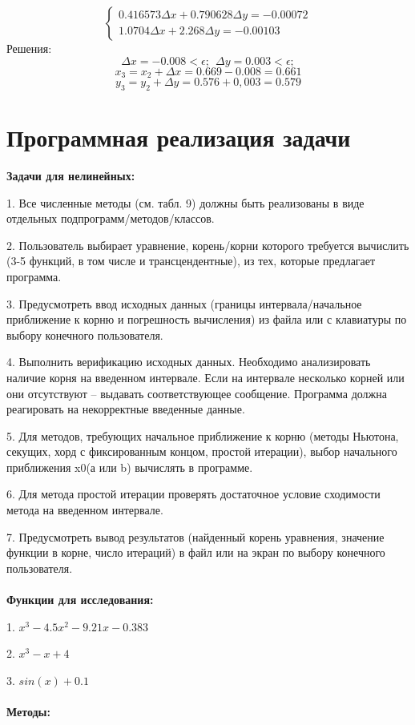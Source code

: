 \documentclass{article}
\begin{document}
\[\begin{cases}
    0.416573\Delta x +0.790628\Delta y = -0.00072\\
    1.0704\Delta x + 2.268\Delta y = -0.00103
\end{cases} 
\]
Решения:
\[\Delta x = -0.008 < \epsilon; \ \ 
\Delta y = 0.003 < \epsilon;
\]
\[x_3 = x_2 + \Delta x = 0.669 - 0.008 = 0.661\]
\[y_3 = y_2 + \Delta y = 0.576 + 0,003 = 0.579\]

\section{Программная реализация задачи}
\textbf{Задачи для нелинейных:}

1. Все численные методы (см. табл. 9) должны быть реализованы в виде отдельных подпрограмм/методов/классов.

2. Пользователь выбирает уравнение, корень/корни которого требуется вычислить (3-5 функций, в том числе и трансцендентные), из тех, которые предлагает программа.

3. Предусмотреть ввод исходных данных (границы интервала/начальное приближение к корню и погрешность вычисления) из файла или с клавиатуры по
выбору конечного пользователя.

4. Выполнить верификацию исходных данных. Необходимо анализировать наличие корня на введенном интервале. Если на интервале несколько корней или
они отсутствуют – выдавать соответствующее сообщение. Программа должна
реагировать на некорректные введенные данные.

5. Для методов, требующих начальное приближение к корню (методы Ньютона,
секущих, хорд с фиксированным концом, простой итерации), выбор начального приближения x0(а или b) вычислять в программе.

6. Для метода простой итерации проверять достаточное условие сходимости метода на введенном интервале.

7. Предусмотреть вывод результатов (найденный корень уравнения, значение
функции в корне, число итераций) в файл или на экран по выбору конечного
пользователя.
\\ \\
\textbf{Функции для исследования: }

1. $x^3 - 4.5x^2 - 9.21x - 0.383$

2. $x^3 - x + 4$

3. $sin(x) + 0.1$
\\ \\
\textbf{Методы: }
\end{document}
